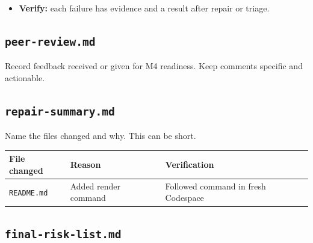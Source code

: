 \documentclass[
  letterpaper,
  DIV=11,
  numbers=noendperiod,
  oneside]{scrreprt}
\providecommand{\tightlist}{%
  \setlength{\itemsep}{0pt}\setlength{\parskip}{0pt}}
\begin{document}
\begin{itemize}
\tightlist
\item
  \textbf{Verify:} each failure has evidence and a result after repair
  or triage.
\end{itemize}

\subsection*{\texorpdfstring{\texttt{peer-review.md}}{peer-review.md}}\label{peer-review.md}

Record feedback received or given for M4 readiness. Keep comments
specific and actionable.

\subsection*{\texorpdfstring{\texttt{repair-summary.md}}{repair-summary.md}}\label{repair-summary.md}

Name the files changed and why. This can be short.

\begin{longtable}[]{@{}
  >{\raggedright\arraybackslash}p{}
  >{\raggedright\arraybackslash}p{}
  >{\raggedright\arraybackslash}p{}@{}}
\toprule\noalign{}
\begin{minipage}[b]{\linewidth}\raggedright
File changed
\end{minipage} & \begin{minipage}[b]{\linewidth}\raggedright
Reason
\end{minipage} & \begin{minipage}[b]{\linewidth}\raggedright
Verification
\end{minipage} \\
\midrule\noalign{}
\endhead
\bottomrule\noalign{}
\endlastfoot
\texttt{README.md} & Added render command & Followed command in fresh
Codespace \\
\end{longtable}

\subsection*{\texorpdfstring{\texttt{final-risk-list.md}}{final-risk-list.md}}\label{final-risk-list.md}
\end{document}

